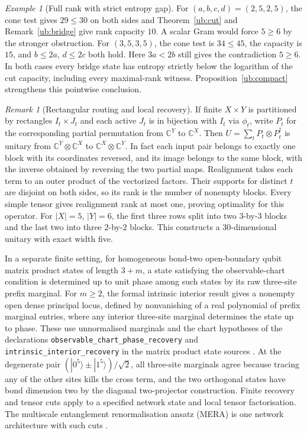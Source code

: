\documentclass[aps,pra,onecolumn,superscriptaddress,nofootinbib,10pt]{revtex4-2}
\theoremstyle{definition}
\theoremstyle{remark}
\newtheorem{remark}[theorem]{Remark}
\newtheorem{example}[theorem]{Example}
\begin{document}
\begin{example}[Full rank with strict entropy gap]\label{ub:flatcounter}
For $(a,b,c,d)=(2,5,2,5)$, the cone test gives $29\le30$
on both sides and Theorem~\ref{ub:cut} and Remark~\ref{ub:bridge}
give rank capacity $10$. A scalar Gram would force $5\ge6$
by the stronger obstruction. For $(3,5,3,5)$, the cone test is
$34\le45$, the capacity is $15$, and $b\le2a$, $d\le2c$ both hold.
Here $3a<2b$ still gives the contradiction $5\ge6$.
In both cases every bridge state has entropy strictly below the
logarithm of the cut capacity, including every maximal-rank witness.
Proposition~\ref{ub:compact} strengthens this pointwise conclusion.
\end{example}

\begin{remark}[Rectangular routing and local recovery]\label{ub:othernets}
If finite $X\times Y$ is partitioned by rectangles $I_t\times J_t$
and each active $J_t$ is in bijection with $I_t$ via $\phi_t$,
write $P_t$ for the corresponding partial permutation from
$\mathbb C^Y$ to $\mathbb C^X$. Then $U=\sum_tP_t\otimes P_t^\dagger$
is unitary from $\mathbb C^Y\otimes\mathbb C^X$ to
$\mathbb C^X\otimes\mathbb C^Y$. In fact each input pair belongs to
exactly one block with its coordinates reversed, and its image belongs
to the same block, with the inverse obtained by reversing the two
partial maps. Realignment takes each term to an outer product of the
vectorized factors. Their supports for distinct $t$ are disjoint
on both sides, so its rank is the number of nonempty blocks.
Every simple tensor gives realignment rank at most one, proving
optimality for this operator. For $|X|=5$, $|Y|=6$, the first three
rows split into two $3$-by-$3$ blocks and the last two into three
$2$-by-$2$ blocks. This constructs a $30$-dimensional unitary
with exact width five.

In a separate finite setting, for homogeneous bond-two
open-boundary qubit matrix product states of length $3+m$, a state
satisfying the observable-chart condition is determined up to unit
phase among such states by its raw three-site prefix marginal.
For $m\ge2$, the formal intrinsic interior result gives a nonempty open
dense principal locus, defined by nonvanishing of a real polynomial
of prefix marginal entries, where any interior three-site marginal
determines the state up to phase. These use unnormalised marginals and
the chart hypotheses of the declarations
\texttt{observable\_chart\_phase\_recovery} and
\texttt{intrinsic\_interior\_recovery} in the matrix product state
sources \cite{ub:lean}. At the degenerate
pair $(|0^5\rangle\pm|1^5\rangle)/\sqrt2$, all three-site marginals
agree because tracing any of the other sites kills the cross term,
and the two orthogonal states have bond dimension two by the diagonal
two-projector construction. Finite recovery and tensor cuts apply to
a specified network state and local tensor factorisation.
The multiscale entanglement renormalisation ansatz (MERA)
is one network architecture with such cuts
\cite{ub:vidal,ub:cui}.
\end{remark}
\end{document}
